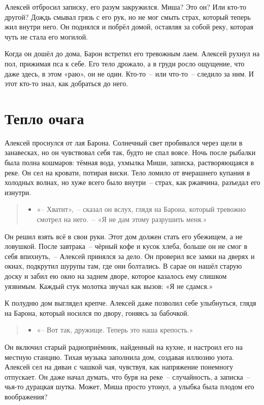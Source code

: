 \documentclass[12pt,a4paper]{book}
\newenvironment{dialogue}{\begin{quote}\itshape\begin{itemize}\item[]}{\end{itemize}\end{quote}}
\begin{document}
Алексей отбросил записку, его разум закружился. Миша? Это он? Или кто-то другой? Дождь смывал грязь с его рук, но не мог смыть страх, который теперь жил внутри него. Он поднялся и побрёл домой, оставляя за собой реку, которая чуть не стала его могилой.

Когда он дошёл до дома, Барон встретил его тревожным лаем. Алексей рухнул на пол, прижимая пса к себе. Его тело дрожало, а в груди росло ощущение, что даже здесь, в этом «раю», он не один. Кто-то~-- или что-то~-- следило за ним. И этот кто-то знал, как добраться до него.

\chapter{Тепло очага}

Алексей проснулся от лая Барона. Солнечный свет пробивался через щели в занавесках, но он чувствовал себя так, будто не спал вовсе. Ночь после рыбалки была полна кошмаров: тёмная вода, ухмылка Миши, записка, растворяющаяся в реке. Он сел на кровати, потирая виски. Тело ломило от вчерашнего купания в холодных волнах, но хуже всего было внутри~-- страх, как ржавчина, разъедал его изнутри.

\begin{dialogue}
«-- Хватит»,~-- сказал он вслух, глядя на Барона, который тревожно смотрел на него.~-- «Я не дам этому разрушить меня.»
\end{dialogue}

Он решил взять всё в свои руки. Этот дом должен стать его убежищем, а не ловушкой. После завтрака~-- чёрный кофе и кусок хлеба, больше он не смог в себя впихнуть,~-- Алексей принялся за дело. Он проверил все замки на дверях и окнах, подкрутил шурупы там, где они болтались. В сарае он нашёл старую доску и забил ею окно на заднем дворе, которое казалось ему слишком уязвимым. Каждый стук молотка звучал как вызов: «Я не сдамся.»

К полудню дом выглядел крепче. Алексей даже позволил себе улыбнуться, глядя на Барона, который носился по двору, гоняясь за бабочкой.

\begin{dialogue}
«-- Вот так, дружище. Теперь это наша крепость.»
\end{dialogue}

Он включил старый радиоприёмник, найденный на кухне, и настроил его на местную станцию. Тихая музыка заполнила дом, создавая иллюзию уюта. Алексей сел на диван с чашкой чая, чувствуя, как напряжение понемногу отпускает. Он даже начал думать, что буря на реке~-- случайность, а записка~-- чья-то дурацкая шутка. Может, Миша просто утонул, а улыбка была плодом его воображения?
\end{document}
